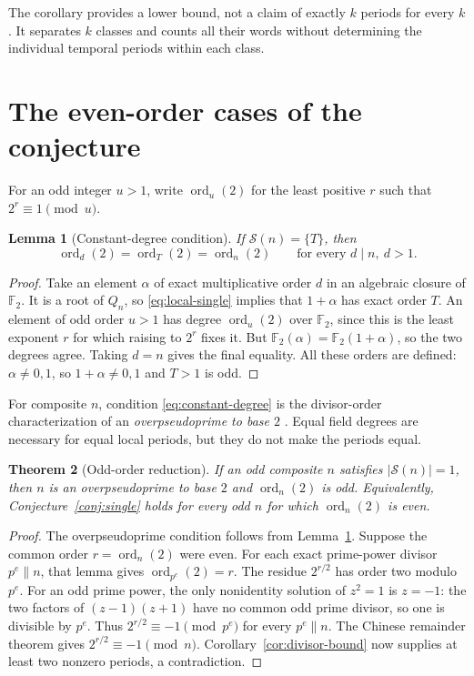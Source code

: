 \documentclass[11pt]{article}
\newtheorem{theorem}{Theorem}[section]
\newtheorem{lemma}[theorem]{Lemma}
\theoremstyle{definition}
\theoremstyle{remark}
\numberwithin{equation}{section}
\newcommand{\F}{\mathbb F_2}
\newcommand{\Spec}{\mathcal S}
\DeclareMathOperator{\ord}{ord}
\begin{document}
The corollary provides a lower bound, not a claim of exactly $k$ periods
for every $k$. It separates $k$ classes and counts all their words without
determining the individual temporal periods within each class.

\section{The even-order cases of the conjecture}\label{sec:odd-order}

For an odd integer $u>1$, write $\ord_u(2)$ for the least positive
$r$ such that $2^r\equiv1\pmod u$.

\begin{lemma}[Constant-degree condition]\label{lem:degree}
If $\Spec(n)=\{T\}$, then
\begin{equation}\label{eq:constant-degree}
 \ord_d(2)=\ord_T(2)=\ord_n(2)
 \qquad\text{for every }d\mid n,\ d>1.
\end{equation}
\end{lemma}

\begin{proof}
Take an element $\alpha$ of exact multiplicative order $d$ in an
algebraic closure of $\F$. It is a root of $Q_n$, so
\eqref{eq:local-single} implies that $1+\alpha$ has exact order $T$.
An element of odd order $u>1$ has degree $\ord_u(2)$ over $\F$, since
this is the least exponent $r$ for which raising to $2^r$ fixes it.
But $\F(\alpha)=\F(1+\alpha)$, so the two degrees agree. Taking $d=n$
gives the final equality. All these orders are defined: $\alpha\ne0,1$,
so $1+\alpha\ne0,1$ and $T>1$ is odd.
\end{proof}

For composite $n$, condition \eqref{eq:constant-degree} is the
divisor-order characterization of an \emph{overpseudoprime to base $2$}
\cite[Theorem~2]{Overpseudoprimes}. Equal field degrees are necessary
for equal local periods, but they do not make the periods equal.

\begin{theorem}[Odd-order reduction]\label{thm:odd-order}
If an odd composite $n$ satisfies $|\Spec(n)|=1$, then $n$ is an
overpseudoprime to base $2$ and $\ord_n(2)$ is odd. Equivalently,
Conjecture~\ref{conj:single} holds for every odd $n$ for which
$\ord_n(2)$ is even.
\end{theorem}

\begin{proof}
The overpseudoprime condition follows from Lemma~\ref{lem:degree}.
Suppose the common order $r=\ord_n(2)$ were even. For each exact
prime-power divisor $p^e\parallel n$, that lemma gives
$\ord_{p^e}(2)=r$. The residue $2^{r/2}$ has order two modulo $p^e$.
For an odd prime power, the only nonidentity solution of $z^2=1$ is
$z=-1$: the two factors of $(z-1)(z+1)$ have no common odd prime
divisor, so one is divisible by $p^e$.
Thus $2^{r/2}\equiv-1\pmod{p^e}$ for every $p^e\parallel n$.
The Chinese remainder theorem gives $2^{r/2}\equiv-1\pmod n$.
Corollary~\ref{cor:divisor-bound} now supplies at least two nonzero
periods, a contradiction.
\end{proof}
\end{document}
